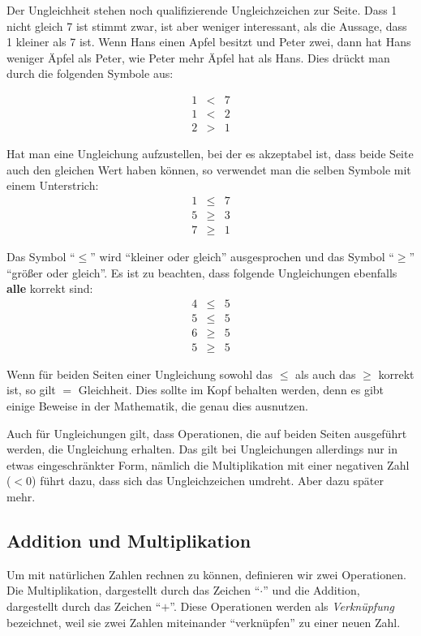 Der Ungleichheit stehen noch qualifizierende Ungleichzeichen zur Seite. Dass 1 nicht gleich 7 ist stimmt zwar, ist aber weniger interessant, als die Aussage, dass 1 kleiner als 7 ist. Wenn Hans einen Apfel besitzt und Peter zwei, dann hat Hans weniger Äpfel als Peter, wie Peter mehr Äpfel hat als Hans. Dies drückt man durch die folgenden Symbole aus:

\begin{eqnarray*}
1 & < & 7 \\
1 & < & 2 \\
2 & > & 1
\end{eqnarray*}

Hat man eine Ungleichung aufzustellen, bei der es akzeptabel ist, dass beide Seite auch den gleichen Wert haben können, so verwendet man die selben Symbole mit einem Unterstrich:
\begin{eqnarray*}
1 & \le & 7 \\
5 & \ge & 3 \\
7 & \ge & 1
\end{eqnarray*}

Das Symbol "`$\le$"' wird "`kleiner oder gleich"' ausgesprochen und das Symbol "`$\ge$"' "`größer oder gleich"'. Es ist zu beachten, dass folgende Ungleichungen ebenfalls \textbf{alle} korrekt sind:
\begin{eqnarray*}
4 & \le & 5 \\
5 & \le & 5 \\
6 & \ge & 5 \\
5 & \ge & 5
\end{eqnarray*}

Wenn für beiden Seiten einer Ungleichung sowohl das $\le$ als auch das $\ge$ korrekt ist, so gilt $=$ Gleichheit. Dies sollte im Kopf behalten werden, denn es gibt einige Beweise in der Mathematik, die genau dies ausnutzen.

Auch für Ungleichungen gilt, dass Operationen, die auf beiden Seiten ausgeführt werden, die Ungleichung erhalten. Das gilt bei Ungleichungen allerdings nur in etwas eingeschränkter Form, nämlich die Multiplikation mit einer negativen Zahl ($<0$) führt dazu, dass sich das Ungleichzeichen umdreht. Aber dazu später mehr.

\subsection{Addition und Multiplikation}

\begin{definition}
Um mit natürlichen Zahlen rechnen zu können, definieren wir zwei Operationen. Die Multiplikation, dargestellt durch das Zeichen "`$\cdot$"' und die Addition, dargestellt durch das Zeichen "`$+$"'. Diese Operationen werden als \textsl{Verknüpfung} bezeichnet, weil sie zwei Zahlen miteinander "`verknüpfen"' zu einer neuen Zahl.
\end{definition}

